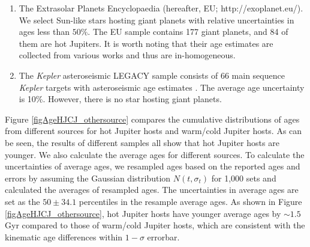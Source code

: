 \documentclass[twocolumn]{pnas-new}
\begin{document}
\begin{enumerate}
\item The Extrasolar Planets Encyclopaedia (hereafter, EU; http://exoplanet.eu/).
We select Sun-like stars hosting giant planets with relative uncertainties in ages less than $50\%$. 
The EU sample contains 177 giant planets, and 84 of them are hot Jupiters. 
It is worth noting that their age estimates are collected from various works and thus are in-homogeneous.

\item The {\it Kepler} asteroseismic LEGACY sample consists of 66 main sequence {\it Kepler} targets with asteroseismic age estimates \citep{2017ApJ...835..173S} . 
The average age uncertainty is 10\%. However, there is no star hosting giant planets. 
\end{enumerate}

Figure \ref{figAgeHJCJ_othersource} compares the cumulative distributions of ages from different sources for hot Jupiter hosts and warm/cold Jupiter hosts.
As can be seen, the results of different samples all show that hot Jupiter hosts are younger.
We also calculate the average ages for different sources.
To calculate the uncertainties of average ages, we resampled ages based on the reported ages and errors by assuming the Gaussian distribution $N (t, \sigma_t)$ for 1,000 sets and calculated the averages of resampled ages.
The uncertainties in average ages are set as the $50 \pm 34.1$ percentiles in the resample average ages.
As shown in Figure \ref{figAgeHJCJ_othersource}, hot Jupiter hosts have younger average ages by $\sim 1.5$ Gyr compared to those of warm/cold Jupiter hosts, which are consistent with the kinematic age differences within $1-\sigma$ errorbar.
\end{document}
